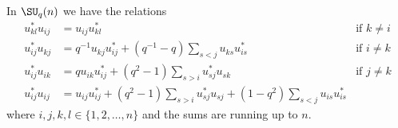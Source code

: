 \begin{lemma}
	In \( \SU_q(n)\) we have the relations\cite{Koelink,Bragiel}
	\begin{subequations}
		\begin{align}
			u^*_{kl}u_{ij} & =u_{ij}u^*_{kl}                                                                                           & \text{if }k\neq i\label{eqREflsuusikl}               \\
			u_{ij}^*u_{kj} & =q^{-1}u_{kj}u^*_{ij}+(q^{-1}-q)\sum_{s<j}u_{ks}u^*_{is}                                                  & \text{if }i\neq k     \label{subequkluijeqkneqiuust} \\
			u^*_{ij}u_{ik} & =qu_{ik}u_{ij}^*+(q^2-1)\sum_{s>i}u^*_{sj}u_{sk}                                                          & \text{if }j\neq k                                    \\
			u^*_{ij}u_{ij} & =u_{ij}u_{ij}^*+(q^2-1)\sum_{s>i}u^*_{sj}u_{sj}+(1-q^2)\sum_{s<j}u_{is}u^*_{is}\label{EqLemsumsumstarpar}
		\end{align}
	\end{subequations}
	where \( i,j,k,l\in\{ 1,2,\ldots,n \}\) and the sums are running up to \( n\).
\end{lemma}

